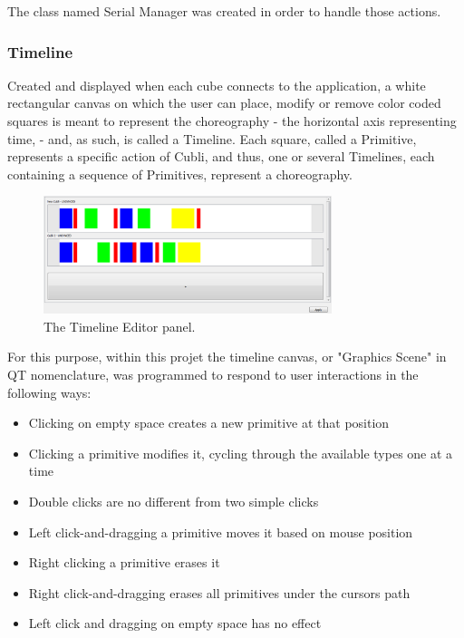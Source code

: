 The class named Serial Manager was created in order to handle those actions. 

\subsubsection{Timeline}

Created and displayed when each cube connects to the application, a white rectangular canvas on which the user can place, modify or remove color coded squares is meant to represent the choreography - the horizontal axis representing time, - and, as such, is called a Timeline. Each square, called a Primitive, represents a specific action of Cubli, and thus, one or several Timelines, each containing a sequence of Primitives, represent a choreography. \\

\begin{figure}[ht]
   \centering
   \includegraphics[width=0.75\textwidth]{img/TimelinesPanel.png}
   \caption{The Timeline Editor panel.}
   \label{img:TimelinesPanel}
\end{figure}

For this purpose, within this projet the timeline canvas, or "Graphics Scene" in QT nomenclature, was programmed to respond to user interactions in the following ways: 
\begin{itemize}
\item Clicking on empty space creates a new primitive at that position 
\item Clicking a primitive modifies it, cycling through the available types one at a time 
\item Double clicks are no different from two simple clicks 
\item Left click-and-dragging a primitive moves it based on mouse position 
\item Right clicking a primitive erases it 
\item Right click-and-dragging erases all primitives under the cursors path 
\item Left click and dragging on empty space has no effect 
\end{itemize}

